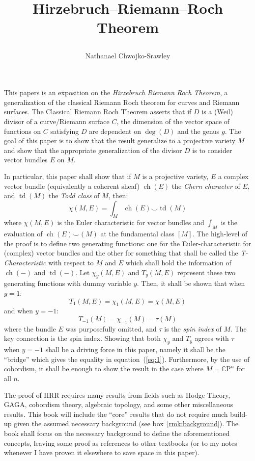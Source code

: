 \documentclass{book}
\title{
	\begin{huge}
		\bf{Hirzebruch–Riemann–Roch Theorem}
	\end{huge}
	}
\author{Nathanael Chwojko-Srawley}
\newcommand{\CP}{{\mathbb{C}\mathrm{P}}}
\newcommand{\ch}{{\operatorname{ch}}}
\renewcommand{\deg}{{\operatorname{deg}}}
\newcommand{\td}{{\operatorname{td}}}
\renewcommand{\ch}{{\operatorname{ch}}}
\begin{document}
\maketitle
\tableofcontents

\newpage

This papers is an exposition on the \emph{Hirzebruch Riemann Roch Theorem}, a generalization of the classical
Riemann Roch theorem for curves and Riemann surfaces. The Classical Riemann Roch Theorem asserts that if $D$
is a (Weil) divisor of a curve/Riemann surface $C$, the dimension of the vector space of functions on $C$
satisfying $D$ are dependent on $\deg(D)$ and the genus $g$. The goal of this paper is to
show that the result generalize to a projective variety $M$ and show that the appropriate generalization of the
divisor $D$ is to consider vector bundles $E$ on $M$.

In particular, this paper shall show that if $M$ is a projective variety, $E$ a complex vector bundle (equivalently a
coherent sheaf) $\ch(E)$ the \emph{Chern character} of $E$, and $\td(M)$ the \emph{Todd class} of $M$, then:
\begin{equation}\label{eq:1}
  \chi(M, E) = \int_M \ch(E)\smile \td(M)
\end{equation}
where $\chi(M, E)$ is the Euler characteristic for vector bundles and $\int_M$ is the evaluation of
$\ch(E)\smile (M)$ at the fundamental class $[M]$. The high-level of the proof is to define two generating
functions: one for the Euler-characteristic for (complex) vector bundles and the other for
something that shall be called the \emph{T-Characteristic} with respect to $M$ and $E$ which shall hold the
information of $\ch(-)$ and $\td(-)$. Let $\chi_y(M,E)$ and $T_y(M,E)$ represent these two generating
functions with dummy variable $y$. Then, it shall be shown that when $y=1$:
\[
  T_1(M,E) = \chi_1(M,E) = \chi(M,E)
\]
and when $y = -1$:
\[
  T_{-1}(M) = \chi_{-1}(M) = \tau(M)
\]
where the bundle $E$ was purposefully omitted, and $\tau$ is the \emph{spin index} of $M$. The key connection
is the spin index. Showing that both $\chi_y$ and $T_y$ agrees with $\tau$ when $y=-1$ shall be a driving
force in this paper, namely it shall be the ``bridge'' which gives the equality in equation~(\ref{eq:1}). Furthermore, by
the use of cobordism, it shall be enough to show the result in the case where $M = \CP^n$ for all $n$.



The proof of HRR requires many results from fields such as Hodge Theory, GAGA, cobordism theory, algebraic
topology, and some other miscellaneous results. This book will include the ``core'' results that do not require much
build-up given the assumed necessary background (see box~\ref{rmk:background}). The book shall focus on the
necessary background to define the aforementioned concepts, leaving some proof as references to other
textbooks (or to my notes whenever I have proven it elsewhere to save space in this paper).
\end{document}
